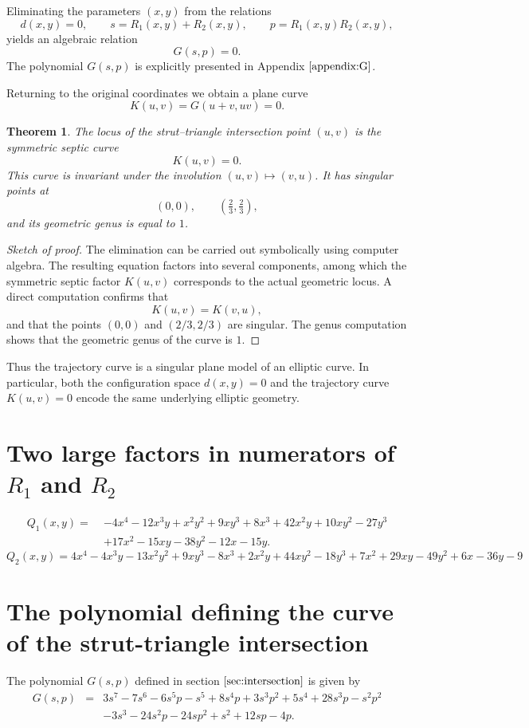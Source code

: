 \documentclass[12pt]{article}
\newtheorem{thm}{Theorem}
\begin{document}
Eliminating the parameters $(x,y)$ from the relations
\[
d(x,y)=0, \qquad
s = R_1(x,y)+R_2(x,y), \qquad
p = R_1(x,y)R_2(x,y),
\]
yields an algebraic relation
\[
G(s,p)=0.
\]
The polynomial $G(s,p)$ is explicitly presented in
Appendix $\ref{appendix:G}$.

Returning to the original coordinates we obtain a plane curve
\[
K(u,v)=G(u+v,uv)=0 .
\]

\begin{thm}
The locus of the strut--triangle intersection point $(u,v)$
is the symmetric septic curve
\[
K(u,v)=0 .
\]
This curve is invariant under the involution $(u,v)\mapsto(v,u)$.
It has singular points at
\[
(0,0), \qquad \left(\tfrac23,\tfrac23\right),
\]
and its geometric genus is equal to $1$.
\end{thm}

\begin{proof}[Sketch of proof]
The elimination can be carried out symbolically using computer algebra.
The resulting equation factors into several components, among which the
symmetric septic factor $K(u,v)$ corresponds to the actual geometric
locus.  A direct computation confirms that
\[
K(u,v)=K(v,u),
\]
and that the points $(0,0)$ and $(2/3,2/3)$ are singular.
The genus computation shows that the geometric genus
of the curve is $1$.
\end{proof}

Thus the trajectory curve is a singular plane model of an
elliptic curve.
In particular, both the configuration space
$d(x,y)=0$ and the trajectory curve $K(u,v)=0$
encode the same underlying elliptic geometry.


\appendix
\section{Two large factors in numerators of $R_1$ and $R_2$}

\begin{align*}
Q_1(x,y)=\;&
-4 x^{4} - 12 x^{3} y + x^{2} y^{2} + 9 x y^{3} + 8 x^{3}
 + 42 x^{2} y + 10 x y^{2} - 27 y^{3} \\
&+ 17 x^{2} - 15 x y - 38 y^{2} - 12 x - 15 y.
\end{align*}
\[
 Q_2(x,y)= 4 x^{4} - 4 x^{3} y - 13 x^{2} y^{2} + 9 x y^{3} - 8 x^{3} + 2 x^{2} y + 44 x y^{2} - 18 y^{3} + 7 x^{2} + 29 x y - 49 y^{2} + 6 x - 36 y - 9
\]

\section{The polynomial defining the curve of the strut-triangle intersection}
\label{appendix:G}
The polynomial $G(s,p)$ defined in section $\ref{sec:intersection}$ is given by
\begin{eqnarray*}
 G(s,p) & =&
 3 \mathit{s}^{7} - 7 \mathit{s}^{6} - 6 \mathit{s}^{5} \mathit{p} - \mathit{s}^{5} + 8 \mathit{s}^{4} \mathit{p} + 3 \mathit{s}^{3} \mathit{p}^{2} + 5 \mathit{s}^{4} + 28 \mathit{s}^{3} \mathit{p} - \mathit{s}^{2} \mathit{p}^{2} \\ &&- 3 \mathit{s}^{3} - 24 \mathit{s}^{2} \mathit{p} - 24 \mathit{s} \mathit{p}^{2} + \mathit{s}^{2} + 12 \mathit{s} \mathit{p} - 4 \mathit{p}.
\end{eqnarray*}
\end{document}
